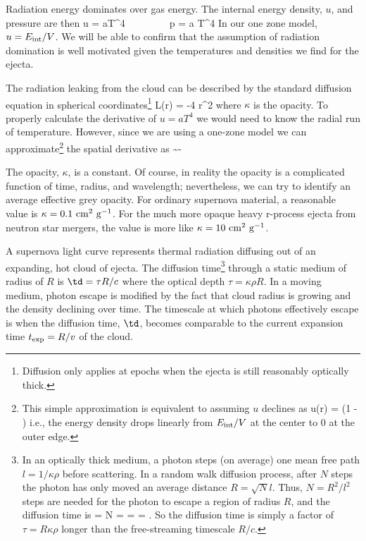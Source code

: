 \documentclass{tufte-handout}
\newcommand{\Eint}{\ensuremath{E_{\rm int}}}
\begin{document}
 Radiation energy dominates over gas energy. The internal energy density, $u$, and pressure are then
\beq
u  = aT^4~~~~~~~~~p =  a T^4
\eeq
In our one zone model, $u = \Eint/V$. 
We will be able to confirm that the assumption of radiation domination is well
motivated given the temperatures and densities we  find for the
ejecta.


The radiation leaking from the cloud can be described by the
standard diffusion equation in spherical coordinates\footnote{Diffusion only applies at
 epochs when the ejecta is still reasonably optically thick.}
\beq
L(r) = -4 \pi r^2  
\label{eq:diff}
\eeq
where $\kappa$ is the opacity. 
To properly calculate the derivative of $u = aT^4$ we would need to know the radial run of
 temperature. However, since we are using a
one-zone model we can approximate\footnote{This simple approximation is equivalent to assuming $u$ declines as
\beq
u(r) = \frac{\Eint}{V} \left(1 -  \right)
\eeq
i.e., the energy density drops linearly from $\Eint/V$ at the center to $0$ at the outer edge.
} 
the spatial derivative as 
\beq
{} \sim -\frac{\Eint/V}{R}
\eeq


The opacity, $\kappa$, is a constant. Of course, in reality the opacity is a complicated function of time, radius, and wavelength; nevertheless, we can try to identify an
average effective grey opacity.  For ordinary supernova material, a reasonable value is
$\kappa = 0.1~{\rm cm^2~g^{-1}}$. 
For the much more opaque heavy r-process ejecta from
neutron star mergers, the value is more like $\kappa = 10~{\rm cm^2~g^{-1}}$. 

\bigskip
{}
\bigskip



\pp A supernova light curve represents thermal radiation diffusing out of an expanding, hot cloud of ejecta. The diffusion time\footnote{In an optically thick medium, a photon
steps (on average) one mean free path
$l = 1/\kappa \rho$ before scattering. In a random walk diffusion process, after  $N$ steps the photon has only moved an average distance $R = \sqrt{N} l$. Thus, $N = R^2/l^2$ steps are 
needed for the photon to escape a region of radius $R$, and the diffusion time is 
\beq
\td = N  =  =  = \tau {}.
\eeq
So the diffusion time is simply a factor of $\tau = R \kappa \rho$ longer than the free-streaming timescale $R/c$.
}
through a static medium of radius of $R$ is  $\td = \tau R/c$
where the optical depth $\tau = \kappa \rho R$.  In a moving medium, photon escape is modified by the fact that cloud radius is growing and the density declining over time. The timescale at 
which photons
effectively escape is when the diffusion time, $ \td$, becomes comparable to the current expansion
time $t_{\rm exp} = R/v$ of the  cloud.  
\end{document}
